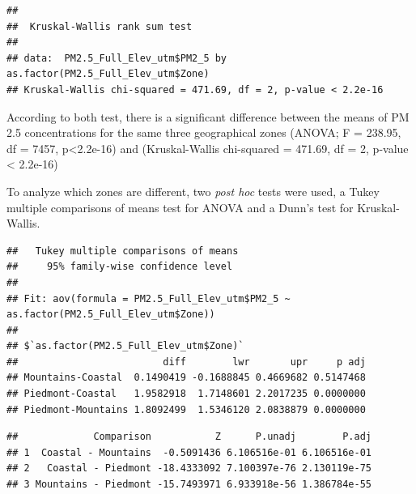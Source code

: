 \documentclass[12pt,]{article}
\newenvironment{Shaded}{\begin{snugshade}}{\end{snugshade}}
\newcommand{\KeywordTok}[1]{\textcolor[rgb]{0.13,0.29,0.53}{\textbf{#1}}}
\newcommand{\DecValTok}[1]{\textcolor[rgb]{0.00,0.00,0.81}{#1}}
\newcommand{\StringTok}[1]{\textcolor[rgb]{0.31,0.60,0.02}{#1}}
\newcommand{\CommentTok}[1]{\textcolor[rgb]{0.56,0.35,0.01}{\textit{#1}}}
\newcommand{\OperatorTok}[1]{\textcolor[rgb]{0.81,0.36,0.00}{\textbf{#1}}}
\newcommand{\NormalTok}[1]{#1}
\begin{document}
\begin{verbatim}
## 
##  Kruskal-Wallis rank sum test
## 
## data:  PM2.5_Full_Elev_utm$PM2_5 by as.factor(PM2.5_Full_Elev_utm$Zone)
## Kruskal-Wallis chi-squared = 471.69, df = 2, p-value < 2.2e-16
\end{verbatim}

According to both test, there is a significant difference between the
means of PM 2.5 concentrations for the same three geographical zones
(ANOVA; F = 238.95, df = 7457, p\textless{}2.2e-16) and (Kruskal-Wallis
chi-squared = 471.69, df = 2, p-value \textless{} 2.2e-16)

To analyze which zones are different, two \emph{post hoc} tests were
used, a Tukey multiple comparisons of means test for ANOVA and a Dunn's
test for Kruskal-Wallis.

\begin{Shaded}
\end{Shaded}

\begin{verbatim}
##   Tukey multiple comparisons of means
##     95% family-wise confidence level
## 
## Fit: aov(formula = PM2.5_Full_Elev_utm$PM2_5 ~ as.factor(PM2.5_Full_Elev_utm$Zone))
## 
## $`as.factor(PM2.5_Full_Elev_utm$Zone)`
##                         diff        lwr       upr     p adj
## Mountains-Coastal  0.1490419 -0.1688845 0.4669682 0.5147468
## Piedmont-Coastal   1.9582918  1.7148601 2.2017235 0.0000000
## Piedmont-Mountains 1.8092499  1.5346120 2.0838879 0.0000000
\end{verbatim}

\begin{Shaded}
\end{Shaded}

\begin{verbatim}
##             Comparison           Z      P.unadj        P.adj
## 1  Coastal - Mountains  -0.5091436 6.106516e-01 6.106516e-01
## 2   Coastal - Piedmont -18.4333092 7.100397e-76 2.130119e-75
## 3 Mountains - Piedmont -15.7493971 6.933918e-56 1.386784e-55
\end{verbatim}
\end{document}
